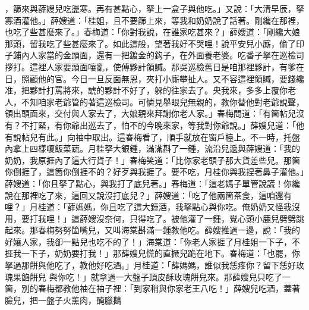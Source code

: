 \begin{showcontents}{}
，篩來與薛嫂兒吃盪寒。再有甚點心，拏上一盒子與他吃。」又說：「大清早辰，拏寡酒灌他。」薛嫂道：「桂姐，且不要篩上來，等我和奶奶說了話著。剛纔在那裡，也吃了些甚麼來了。」春梅道：「你對我說，在誰家吃甚來？」薛嫂道：「剛纔大娘那頭，留我吃了些甚麼來了。如此這般，望著我好不哭哩！說平安兒小廝，偷了印子鋪內人家當的金頭面，還有一把鍍金的鈎子，在外面養老婆。吃番子拏在巡檢司拶打。這裡人家要頭面嚷亂，使傅夥計領贓。那吳巡檢舊日是咱那裡夥計，有爹在日，照顧他的官。今日一旦反面無恩，夾打小廝攀扯人。又不容這裡領贓，要錢纔准，把夥計打罵將來，諕的夥計不好了，躲的往家去了。央我來，多多上覆你老人，不知咱家老爺管的著這巡檢司。可憐見舉眼兒無親的，教你替他對老爺說聲，領出頭面來，交付與人家去了，大娘親來拜謝你老人家。」春梅問道：「有箇帖兒沒有？不打緊，有你爺出巡去了，怕不的今晚來家，等我對你爺說。」薛嫂兒道：「他有說帖兒有此。」向袖中取出。這春梅看了，順手就放在窗戶檯上。不一時，托盤內拿上四樣嗄飯菜蔬。月桂拏大銀鍾，滿滿斟了一鍾，流沿兒遞與薛嫂道：「我的奶奶，我原捱內了這大行貨子！」春梅笑道：「比你家老頭子那大貨差些兒。那箇你倒捱了，這箇你倒捱不的？好歹與我捱了。要不吃，月桂你與我捏著鼻子灌他。」薛嫂道：「你且拏了點心，與我打了底兒著。」春梅道：「這老媽子單管說謊！你纔說在那裡吃了來，這回又說沒打底兒？」薛嫂道：「吃了他兩箇茶食，這咱還有哩？」月桂道：「薛媽媽，你且吃了這大鍾酒，我拏點心與你吃。俺奶奶又怪我沒用，要打我哩！」這薛嫂沒奈何，只得吃了。被他灌了一鍾，覺心頭小鹿兒劈劈跳起來。那春梅努努箇嘴兒，又叫海棠斟滿一鍾教他吃。薛嫂推過一邊，說：「我的好孃人家，我卻一點兒也吃不的了！」海棠道：「你老人家捱了月桂姐一下子，不捱我一下子，奶奶要打我！」那薛嫂兒慌的直撅兒跪在地下。春梅道：「也罷，你拏過那餅與他吃了，教他好吃酒。」月桂道：「薛媽媽，誰似我恁疼你？留下恁好玫瑰果餡餅兒 與你吃！」就拿過一大盤子頂皮酥玫瑰餅兒來。那薛嫂兒只吃了一箇，別的春梅都教他袖在袖子裡：「到家稍與你家老王八吃！」薛嫂兒吃酒，蓋著臉兒，把一盤子火薰肉，醃臘鵝 
\end{showcontents}
